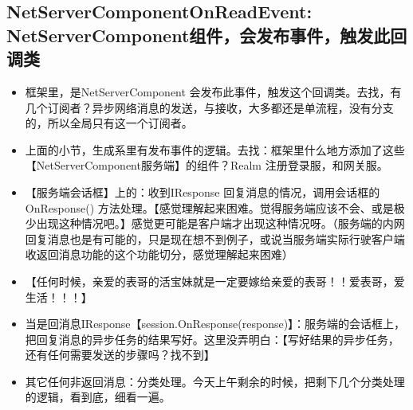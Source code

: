 \documentclass[9pt, b5paper]{article}
\begin{document}
\subsection{NetServerComponentOnReadEvent: NetServerComponent组件，会发布事件，触发此回调类}
\label{sec-8-4}
\begin{itemize}
\item 框架里，是NetServerComponent 会发布此事件，触发这个回调类。去找，有几个订阅者？异步网络消息的发送，与接收，大多都还是单流程，没有分支的，所以全局只有这一个订阅者。
\item 上面的小节，生成系里有发布事件的逻辑。去找：框架里什么地方添加了这些【NetServerComponent服务端】的组件？Realm 注册登录服，和网关服。
\item 【服务端会话框】上的：收到IResponse 回复消息的情况，调用会话框的OnResponse() 方法处理。【感觉理解起来困难。觉得服务端应该不会、或是极少出现这种情况吧。】感觉更可能是客户端才出现这种情况呀。（服务端的内网回复消息也是有可能的，只是现在想不到例子，或说当服务端实际行驶客户端收返回消息功能的这个功能切分，感觉理解起来困难）
\item 【任何时候，亲爱的表哥的活宝妹就是一定要嫁给亲爱的表哥！！爱表哥，爱生活！！！】
\item 当是回消息IResponse【session.OnResponse(response)】：服务端的会话框上，把回复消息的异步任务的结果写好。这里没弄明白：【写好结果的异步任务，还有任何需要发送的步骤吗？找不到】
\item 其它任何非返回消息：分类处理。今天上午剩余的时候，把剩下几个分类处理的逻辑，看到底，细看一遍。
\end{itemize}
\end{document}
